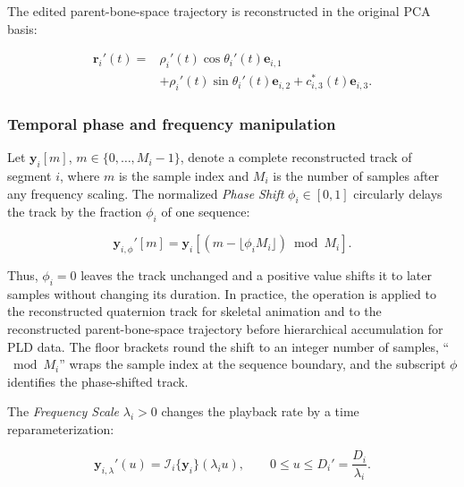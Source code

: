 \documentclass[12pt]{article}
\begin{document}
The edited parent-bone-space trajectory is reconstructed in the original
PCA basis:

\begin{equation}
\begin{split}
\mathbf{r}_i'(t)
={}&
\rho_i'(t)
\cos\theta_i'(t)
\mathbf{e}_{i,1}
\\
&+
\rho_i'(t)
\sin\theta_i'(t)
\mathbf{e}_{i,2}
+
c_{i,3}^{*}(t)
\mathbf{e}_{i,3}.
\end{split}
\label{eq:sup-parent-space-reconstruction}
\end{equation}


\subsubsection{Temporal phase and frequency manipulation}
\label{sup:temporal-manipulation}

Let $\mathbf{y}_i[m]$, $m\in\{0,\ldots,M_i-1\}$, denote a complete
reconstructed track of segment $i$, where $m$ is the sample index and
$M_i$ is the number of samples after any frequency scaling. The
normalized \textit{Phase Shift} $\phi_i\in[0,1]$ circularly delays the
track by the fraction $\phi_i$ of one sequence:

\begin{equation}
\mathbf{y}_{i,\phi}'[m]
=
\mathbf{y}_i\!\left[
\left(m-\lfloor\phi_iM_i\rfloor\right)\bmod M_i
\right].
\label{eq:sup-phase-direction}
\end{equation}

Thus, $\phi_i=0$ leaves the track unchanged and a positive value shifts
it to later samples without changing its duration. In practice, the
operation is applied to the reconstructed quaternion track for skeletal
animation and to the reconstructed parent-bone-space trajectory before
hierarchical accumulation for PLD data. The floor brackets round the
shift to an integer number of samples, ``$\bmod M_i$'' wraps the sample
index at the sequence boundary, and the subscript $\phi$ identifies the
phase-shifted track.

The \textit{Frequency Scale} $\lambda_i>0$ changes the playback rate by
a time reparameterization:

\begin{equation}
\mathbf{y}_{i,\lambda}'(u)
=\mathcal{I}_i\{\mathbf{y}_i\}(\lambda_i u),
\qquad
0\leq u\leq D_i'=\frac{D_i}{\lambda_i}.
\label{eq:sup-frequency-remapping}
\end{equation}
\end{document}

